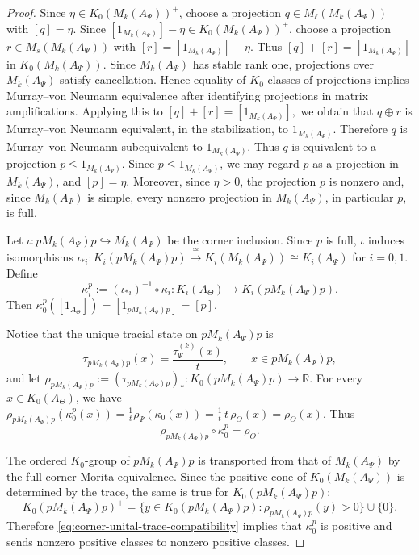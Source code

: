 \documentclass[11pt]{amsart}
\theoremstyle{definition}
\theoremstyle{remark}
\newcommand{\R}{\mathbb{R}}
\begin{document}
\begin{proof}
Since $\eta\in K_0(M_k(A_\Psi))^+$, choose a projection $q\in M_\ell(M_k(A_\Psi))$
with $[q]=\eta$. Since $[1_{M_k(A_\Psi)}]-\eta\in K_0(M_k(A_\Psi))^+$, choose a projection
$r\in M_s(M_k(A_\Psi))$ with $[r]=[1_{M_k(A_\Psi)}]-\eta$. Thus $[q]+[r]=[1_{M_k(A_\Psi)}]$
in $K_0(M_k(A_\Psi))$. Since $M_k(A_\Psi)$ has stable rank one, projections over $M_k(A_\Psi)$
satisfy cancellation.  Hence equality of $K_0$-classes of projections implies
Murray--von Neumann equivalence after identifying projections in matrix
amplifications.  Applying this to $[q]+[r]=[1_{M_k(A_\Psi)}],$
we obtain that $q\oplus r$ is Murray--von Neumann equivalent, in the stabilization,
to $1_{M_k(A_\Psi)}$. Therefore $q$ is Murray--von Neumann subequivalent to
$1_{M_k(A_\Psi)}$. Thus $q$ is equivalent to a projection $p\leq 1_{M_k(A_\Psi)}.$
Since \(p\leq 1_{M_k(A_\Psi)}\), we may regard \(p\) as a projection in
\(M_k(A_\Psi)\), and \([p]=\eta\). Moreover, since $\eta>0$, the projection $p$ is nonzero and, since $M_k(A_\Psi)$
is simple, every nonzero projection in $M_k(A_\Psi)$, in particular $p$, is full.

Let $\iota\colon pM_k(A_{\Psi})p\hookrightarrow M_k(A_{\Psi})$
be the corner inclusion. Since $p$ is full, $\iota$ induces isomorphisms $\iota_{*i}\colon K_i(pM_k(A_{\Psi})p )\xrightarrow{\cong}K_i(M_k(A_{\Psi}))\cong K_i(A_\Psi)$ for $i=0,1.$ Define
\[
\kappa_i^p:=(\iota_{*i})^{-1}\circ\kappa_i
\colon K_i(A_\Theta)\to K_i(pM_k(A_{\Psi})p).
\]
Then $\kappa_0^p([1_{A_\Theta}])=[1_{pM_k(A_{\Psi})p}]=[p].$

Notice that the unique tracial state on $pM_k(A_{\Psi})p$ is \[\tau_{pM_k(A_{\Psi})p}(x)
=
\frac{\tau_\Psi^{(k)}(x)}{t},
\qquad x\in pM_k(A_{\Psi})p,\]
and let
$\rho_{pM_k(A_{\Psi})p}:=(\tau_{pM_k(A_{\Psi})p})_*\colon K_0(pM_k(A_{\Psi})p)\to\R.$
For every $x\in K_0(A_\Theta)$, we have $\rho_{pM_k(A_{\Psi})p}(\kappa_0^p(x))=\frac{1}{t}\rho_\Psi(\kappa_0(x))
=\frac{1}{t}\,t\,\rho_\Theta(x)
=\rho_\Theta(x).$
Thus
\begin{equation}\label{eq:corner-unital-trace-compatibility}
\rho_{pM_k(A_{\Psi})p}\circ\kappa_0^p=\rho_\Theta.
\end{equation}

The ordered $K_0$-group of $pM_k(A_{\Psi})p$ is transported from that of $M_k(A_{\Psi})$ by the full-corner Morita equivalence. Since the positive cone of $K_0(M_k(A_{\Psi}))$ is determined by the trace, the same is true for $K_0(pM_k(A_{\Psi})p)$:
\[
K_0(pM_k(A_{\Psi})p)^+
=
\{y\in K_0(pM_k(A_{\Psi})p):\rho_{pM_k(A_{\Psi})p}(y)>0\}\cup\{0\}.
\]
Therefore \eqref{eq:corner-unital-trace-compatibility} implies that $\kappa_0^p$ is positive and sends nonzero positive classes to nonzero positive classes. 


\end{proof}
\end{document}
